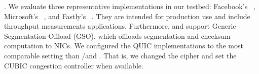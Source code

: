 
\textbf{\quic}.
We evaluate three representative \quic implementations in our testbed: 
Facebook's \mvfst~\cite{mvfst-github,Joras_mvfst}, Microsoft's
\msquic~\cite{msquic-github}, and Fastly's \quicly~\cite{quicly-github}. They
are intended for production use and
include throughput measurements applications.
Furthermore, \mvfst and \quicly support Generic Segmentation Offload (GSO), 
which
offloads \udp segmentation and checksum computation to NICs. 
We configured the QUIC implementations to the most comparable setting than 
\tls/\tcp and \tcpls. That is, we changed the cipher and set the CUBIC 
congestion controller when available.

